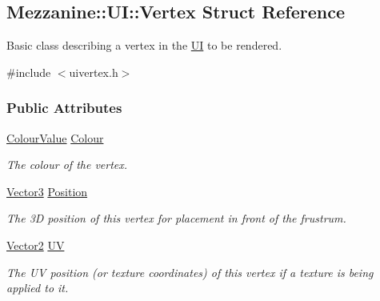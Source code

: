 \hypertarget{structMezzanine_1_1UI_1_1Vertex}{
\subsection{Mezzanine::UI::Vertex Struct Reference}
\label{structMezzanine_1_1UI_1_1Vertex}
}


Basic class describing a vertex in the \hyperlink{namespaceMezzanine_1_1UI}{UI} to be rendered.  




{\ttfamily \#include $<$uivertex.h$>$}

\subsubsection*{Public Attributes}
\begin{DoxyCompactItemize}
\item 
\hypertarget{structMezzanine_1_1UI_1_1Vertex_aab6b45269e3e78d1cc7053c2f976fc3c}{
\hyperlink{classMezzanine_1_1ColourValue}{ColourValue} \hyperlink{structMezzanine_1_1UI_1_1Vertex_aab6b45269e3e78d1cc7053c2f976fc3c}{Colour}}
\label{structMezzanine_1_1UI_1_1Vertex_aab6b45269e3e78d1cc7053c2f976fc3c}

\begin{DoxyCompactList}\small\item\em The colour of the vertex. \item\end{DoxyCompactList}\item 
\hypertarget{structMezzanine_1_1UI_1_1Vertex_a9f9ab1c9be1171e2b5ad6cff63f7e194}{
\hyperlink{classMezzanine_1_1Vector3}{Vector3} \hyperlink{structMezzanine_1_1UI_1_1Vertex_a9f9ab1c9be1171e2b5ad6cff63f7e194}{Position}}
\label{structMezzanine_1_1UI_1_1Vertex_a9f9ab1c9be1171e2b5ad6cff63f7e194}

\begin{DoxyCompactList}\small\item\em The 3D position of this vertex for placement in front of the frustrum. \item\end{DoxyCompactList}\item 
\hypertarget{structMezzanine_1_1UI_1_1Vertex_a455d8bcb1bf8ada3df6f1602745c7619}{
\hyperlink{classMezzanine_1_1Vector2}{Vector2} \hyperlink{structMezzanine_1_1UI_1_1Vertex_a455d8bcb1bf8ada3df6f1602745c7619}{UV}}
\label{structMezzanine_1_1UI_1_1Vertex_a455d8bcb1bf8ada3df6f1602745c7619}

\begin{DoxyCompactList}\small\item\em The UV position (or texture coordinates) of this vertex if a texture is being applied to it. \item\end{DoxyCompactList}\end{DoxyCompactItemize}


